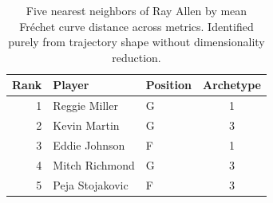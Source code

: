 \begin{table}[htbp]
  \centering\small
  \begin{tabular}{rllc}
    \toprule
    Rank & Player & Position & Archetype \\
    \midrule
    1 & Reggie Miller & G & 1 \\
    2 & Kevin Martin & G & 3 \\
    3 & Eddie Johnson & F & 1 \\
    4 & Mitch Richmond & G & 3 \\
    5 & Peja Stojakovic & F & 3 \\
    \bottomrule
  \end{tabular}
  \caption{Five nearest neighbors of Ray Allen by mean Fr\'{e}chet curve distance across metrics. Identified purely from trajectory shape without dimensionality reduction.}
  \label{tab:Ray_Allen_frechet_curve_neighbors}
\end{table}


